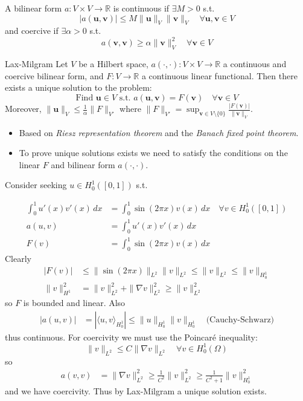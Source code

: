 A bilinear form $a: V \times V \to \mathbb{R}$ is continuous if $\exists M > 0$ s.t.
\[|a(\mathbf{u}, \mathbf{v})| \leq M \|\mathbf{u}\|_V \|\mathbf{v}\|_V \quad \forall \mathbf{u}, \mathbf{v} \in V\]
and coercive if $\exists \alpha > 0$ s.t.
\[a(\mathbf{v}, \mathbf{v}) \geq \alpha \|\mathbf{v}\|_V^2 \quad \forall \mathbf{v} \in V\]

\begin{theorem}{Lax-Milgram}{}
    Let $V$ be a Hilbert space, $a(\cdot, \cdot): V \times V \to \mathbb{R}$ a continuous and coercive bilinear form, and $F: V \to \mathbb{R}$ a continuous linear functional. Then there exists a unique solution to the problem:
    \[
        \text{Find } \mathbf{u} \in V \text{ s.t. }
        a(\mathbf{u}, \mathbf{v}) = F(\mathbf{v}) \quad \forall \mathbf{v} \in V
    \]
    Moreover, $\|\mathbf{u}\|_V \leq \frac{1}{\alpha} \|F\|_{V'}$ where $\|F\|_{V'} = \sup_{\mathbf{v} \in V \setminus \{0\}} \frac{|F(\mathbf{v})|}{\|\mathbf{v}\|_V}$.
\end{theorem}
\begin{itemize}
    \item Based on \emph{Riesz representation theorem} and the \emph{Banach fixed point theorem}.
    \item To prove unique solutions exists we need to satisfy the conditions on the linear $F$ and bilinear form $a(\cdot, \cdot)$.
\end{itemize}

\begin{example}{}{}
    Consider seeking $u \in H^1_0([0, 1])$ s.t.

    \begin{align*}
        \int_0^1 u'(x) v'(x) \, dx & = \int_0^1 \sin(2\pi x) v(x) \, dx \quad \forall v \in H^1_0([0, 1]) \\
        a(u, v)                    & = \int_0^1 u'(x) v'(x) \, dx                                         \\
        F(v)                       & = \int_0^1 \sin(2\pi x) v(x) \, dx
    \end{align*}
    Clearly
    \begin{align*}
        |F(v)|        & \leq \|\sin(2\pi x)\|_{L^2} \|v\|_{L^2} \leq \|v\|_{L^2} \leq \|v\|_{H^1_0} \\
        \|v\|_{H^1}^2 & = \|v\|_{L^2}^2 + \|\nabla v\|_{L^2}^2 \geq \|v\|_{L^2}^2
    \end{align*}
    so $F$ is bounded and linear. Also
    \begin{align*}
        |a(u, v)| & = |\langle u, v \rangle_{H^1_0}| \leq \|u\|_{H^1_0} \|v\|_{H^1_0} \quad \text{(Cauchy-Schwarz)}
    \end{align*}
    thus continuous. For coercivity we must use the Poincaré inequality:
    \[\|v\|_{L^2} \leq C \|\nabla v\|_{L^2} \quad \forall v \in H^1_0(\Omega)\]
    so
    \begin{align*}
        a(v, v) & = \|\nabla v\|_{L^2}^2 \geq \frac{1}{C^2} \|v\|_{L^2}^2 \geq \frac{1}{C^2 + 1} \|v\|_{H^1_0}^2
    \end{align*}
    and we have coercivity.
    Thus by Lax-Milgram a unique solution exists.
\end{example}

